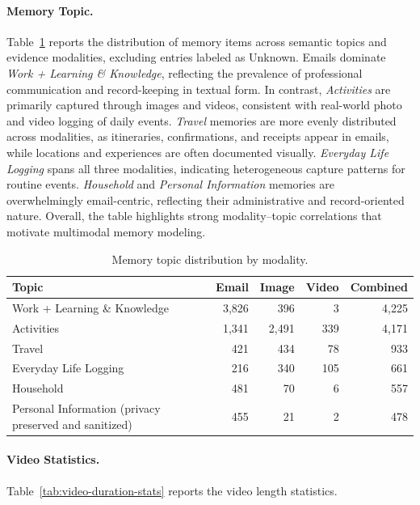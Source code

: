 \documentclass{article}
\theoremstyle{plain}
\theoremstyle{definition}
\theoremstyle{remark}
\begin{document}
\paragraph{Memory Topic.}
Table~\ref{tab:memory-topic-by-modality} reports the distribution of memory items across semantic topics and evidence modalities, excluding entries labeled as Unknown. Emails dominate \textit{Work + Learning \& Knowledge}, reflecting the prevalence of professional communication and record-keeping in textual form. In contrast, \textit{Activities} are primarily captured through images and videos, consistent with real-world photo and video logging of daily events. \textit{Travel} memories are more evenly distributed across modalities, as itineraries, confirmations, and receipts appear in emails, while locations and experiences are often documented visually. \textit{Everyday Life Logging} spans all three modalities, indicating heterogeneous capture patterns for routine events. \textit{Household} and \textit{Personal Information} memories are overwhelmingly email-centric, reflecting their administrative and record-oriented nature. Overall, the table highlights strong modality–topic correlations that motivate multimodal memory modeling.



\begin{table}[tbhp]
\centering
\small
\caption{Memory topic distribution by modality.}
\setlength{\tabcolsep}{6pt}
\begin{tabular}{lrrrr}
\toprule
Topic & Email & Image & Video & Combined \\
\midrule
Work + Learning \& Knowledge & 3{,}826 & 396 & 3 & 4{,}225 \\
Activities & 1{,}341 & 2{,}491 & 339 & 4{,}171 \\
Travel & 421 & 434 & 78 & 933 \\
Everyday Life Logging & 216 & 340 & 105 & 661 \\
Household & 481 & 70 & 6 & 557 \\
Personal Information (privacy preserved and sanitized) & 455 & 21 & 2 & 478 \\
\bottomrule
\end{tabular}%
\label{tab:memory-topic-by-modality}
\end{table}





\paragraph{Video Statistics.} Table~\ref{tab:video-duration-stats} reports the video length statistics.
\end{document}
